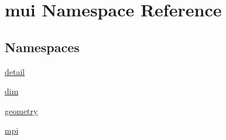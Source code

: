 \hypertarget{namespacemui}{}\section{mui Namespace Reference}
\label{namespacemui}
\subsection*{Namespaces}
\begin{DoxyCompactItemize}
\item 
 \hyperlink{namespacemui_1_1detail}{detail}
\item 
 \hyperlink{namespacemui_1_1dim}{dim}
\item 
 \hyperlink{namespacemui_1_1geometry}{geometry}
\item 
 \hyperlink{namespacemui_1_1mpi}{mpi}
\end{DoxyCompactItemize}
